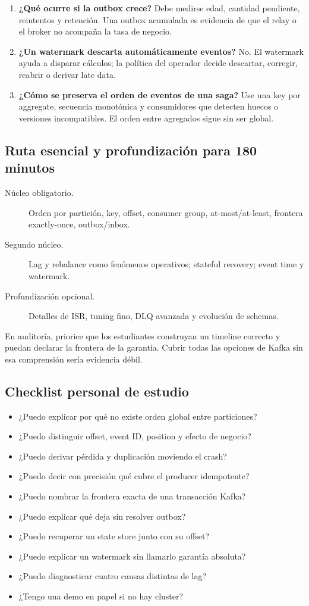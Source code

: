 \documentclass[variant=docente,cover=institutional,mode=screen]{ua-engineering-v6-article}
\begin{document}
\begin{enumerate}
\item \textbf{¿Qué ocurre si la outbox crece?} Debe medirse edad, cantidad pendiente, reintentos y retención. Una outbox acumulada es evidencia de que el relay o el broker no acompaña la tasa de negocio.
\item \textbf{¿Un watermark descarta automáticamente eventos?} No. El watermark ayuda a disparar cálculos; la política del operador decide descartar, corregir, reabrir o derivar late data.
\item \textbf{¿Cómo se preserva el orden de eventos de una saga?} Use una key por aggregate, secuencia monotónica y consumidores que detecten huecos o versiones incompatibles. El orden entre agregados sigue sin ser global.
\end{enumerate}

\subsection{Ruta esencial y profundización para 180 minutos}

\begin{description}
\item[Núcleo obligatorio.] Orden por partición, key, offset, consumer group, at-most/at-least, frontera exactly-once, outbox/inbox.
\item[Segundo núcleo.] Lag y rebalance como fenómenos operativos; stateful recovery; event time y watermark.
\item[Profundización opcional.] Detalles de ISR, tuning fino, DLQ avanzada y evolución de schemas.
\end{description}

En auditoría, priorice que los estudiantes construyan un timeline correcto y puedan declarar la frontera de la garantía. Cubrir todas las opciones de Kafka sin esa comprensión sería evidencia débil.

\subsection{Checklist personal de estudio}

\begin{itemize}
\item ¿Puedo explicar por qué no existe orden global entre particiones?
\item ¿Puedo distinguir offset, event ID, position y efecto de negocio?
\item ¿Puedo derivar pérdida y duplicación moviendo el crash?
\item ¿Puedo decir con precisión qué cubre el producer idempotente?
\item ¿Puedo nombrar la frontera exacta de una transacción Kafka?
\item ¿Puedo explicar qué deja sin resolver outbox?
\item ¿Puedo recuperar un state store junto con su offset?
\item ¿Puedo explicar un watermark sin llamarlo garantía absoluta?
\item ¿Puedo diagnosticar cuatro causas distintas de lag?
\item ¿Tengo una demo en papel si no hay cluster?
\end{itemize}
\end{document}
